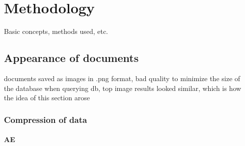 \chapter{Methodology}\label{ch:methodology}

\cite{InformationRetrieval1999}

Basic concepts, methods used, etc.
















\section{Appearance of documents}\label{sec:appearance}
documents saved as images in .png format, bad quality to minimize the size of the database
when querying db, top image results looked similar, which is how the idea of this section arose

\subsection{Compression of data}\label{subsec:compression}
\subsubsection{AE}\label{subsec:autoencoder}





